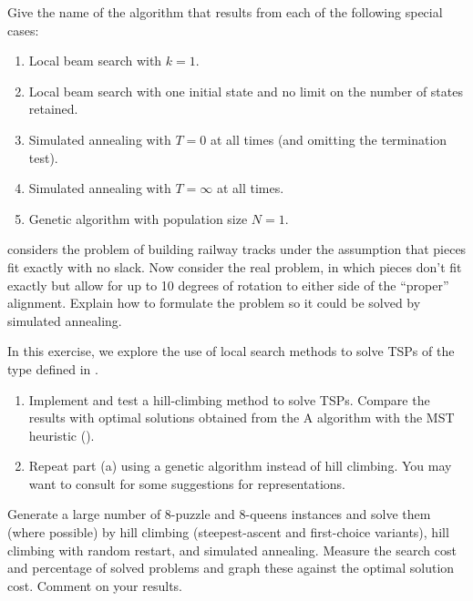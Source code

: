 
\begin{exercise}
Give the name of the algorithm that results from each of the following
special cases:
\begin{enumerate}
\item Local beam search with \(k = 1\).
\item Local beam search with one initial state and no limit on the
number of states retained.
\item Simulated annealing with \(T = 0\) at all times (and omitting the
termination test).
\item Simulated annealing with \(T=\infty\) at all times.
\item Genetic algorithm with population size \(N = 1\).
\end{enumerate}
\end{exercise} 

\begin{exercise}
 considers the problem of building railway tracks under the assumption that pieces fit exactly with no slack.
Now consider the real problem, in which pieces don't fit exactly
but allow for up to 10 degrees of rotation to either side of the ``proper'' alignment.
Explain how to formulate the problem so it could be solved by simulated annealing.
\end{exercise} 

\begin{uexercise}%
\prgex In this exercise, we explore the use of local search methods
to solve TSPs of the type defined in .
\begin{enumerate}
\item Implement and test a hill-climbing method to solve TSPs.
Compare the results with optimal solutions obtained from the
A{\star} algorithm with the MST heuristic ().
\item Repeat part (a) using a genetic algorithm instead of hill
climbing.  You may want to consult  for some
suggestions for representations.
\end{enumerate}
\end{uexercise} 

\begin{exercise}%
\prgex Generate a large number of 8-puzzle and 8-queens instances and
solve them (where possible) by hill climbing
(steepest-ascent and first-choice variants), hill climbing with
random restart, and simulated annealing.  Measure the search cost and percentage of
solved problems and graph these against the optimal solution
cost. Comment on your results.
\end{exercise} 


